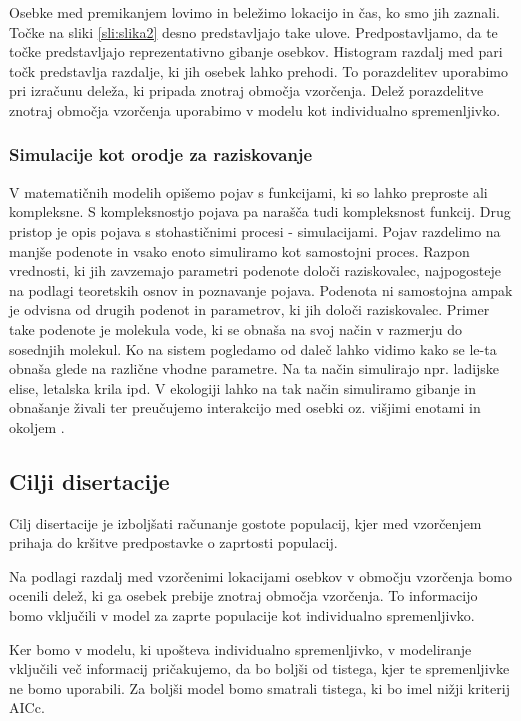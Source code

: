 Osebke med premikanjem lovimo in beležimo lokacijo in čas, ko smo jih zaznali. Točke na sliki \ref{sli:slika2} desno predstavljajo take ulove. Predpostavljamo, da te točke predstavljajo reprezentativno gibanje osebkov. Histogram razdalj med pari točk predstavlja razdalje, ki jih osebek lahko prehodi. To porazdelitev uporabimo pri izračunu deleža, ki pripada znotraj območja vzorčenja. Delež porazdelitve znotraj območja vzorčenja uporabimo v modelu kot individualno spremenljivko.

\subsubsection{Simulacije kot orodje za raziskovanje}
V matematičnih modelih opišemo pojav s funkcijami, ki so lahko preproste ali kompleksne. S kompleksnostjo pojava pa narašča tudi kompleksnost funkcij. Drug pristop je opis pojava s stohastičnimi procesi - simulacijami. Pojav razdelimo na manjše podenote in vsako enoto simuliramo kot samostojni proces. Razpon vrednosti, ki jih zavzemajo parametri podenote določi raziskovalec, najpogosteje na podlagi teoretskih osnov in poznavanje pojava. Podenota ni samostojna ampak je odvisna od drugih podenot in parametrov, ki jih določi raziskovalec. Primer take podenote je molekula vode, ki se obnaša na svoj način v razmerju do sosednjih molekul. Ko na sistem pogledamo od daleč lahko vidimo kako se le-ta obnaša glede na različne vhodne parametre. Na ta način simulirajo npr. ladijske elise, letalska krila ipd. V ekologiji lahko na tak način simuliramo gibanje in obnašanje živali ter preučujemo interakcijo med osebki oz. višjimi enotami in okoljem \citep{bolker_ecological_2008}.

\subsection{Cilji disertacije}
Cilj disertacije je izboljšati računanje gostote populacij, kjer med vzorčenjem prihaja do kršitve predpostavke o zaprtosti populacij.

Na podlagi razdalj med vzorčenimi lokacijami osebkov v območju vzorčenja bomo ocenili delež, ki ga osebek prebije znotraj območja vzorčenja. To informacijo bomo vključili v model za zaprte populacije kot individualno spremenljivko.

Ker bomo v modelu, ki upošteva individualno spremenljivko, v modeliranje vključili več informacij pričakujemo, da bo boljši od tistega, kjer te spremenljivke ne bomo uporabili. Za boljši model bomo smatrali tistega, ki bo imel nižji kriterij AICc.

